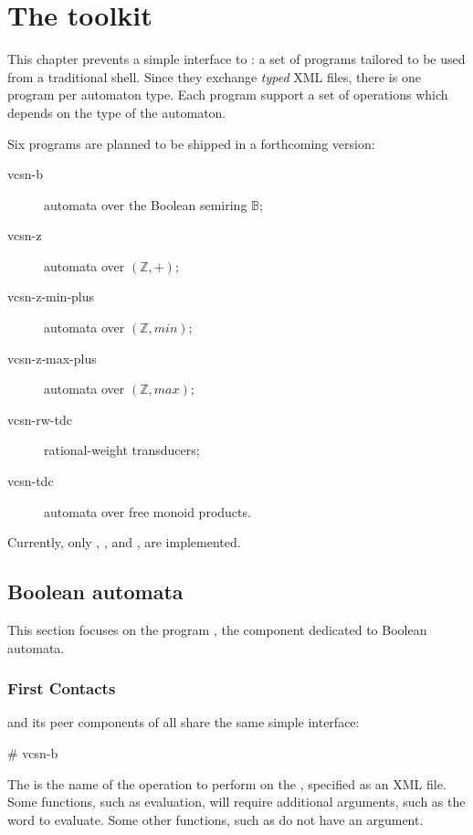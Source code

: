 \chapter{The \Vauc toolkit}

This chapter prevents a simple interface to \Vauc: a set of programs
tailored to be used from a traditional shell.  Since they exchange
\emph{typed} XML files, there is one program per automaton type.  Each
program support a set of operations which depends on the type of the
automaton.

Six programs are planned to be shipped in a forthcoming version:
\begin{description}
\item[vcsn-b] automata over the Boolean semiring $\mathbb{B}$;
\item[vcsn-z] automata over $(\mathbb{Z},+)$;
\item[vcsn-z-min-plus] automata over $(\mathbb{Z},min)$;
\item[vcsn-z-max-plus] automata over $(\mathbb{Z},max)$;
\item[vcsn-rw-tdc] rational-weight transducers;
\item[vcsn-tdc] automata over free monoid products.
\end{description}

Currently, only , , and
, are implemented.

\newpage

\section{Boolean automata}

This section focuses on the program , the
\tafkit component dedicated to Boolean automata.

\subsection{First Contacts}

 and its peer components of \tafkit all share the same
simple interface:

\begin{shell}
# vcsn-b   
\end{shell}

\noindent
The  is the name of the operation to perform on the
, specified as an XML file.  Some functions, such as
evaluation, will require additional arguments, such as the word to
evaluate.  Some other functions, such as  do not have
an  argument.

